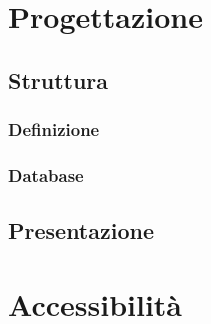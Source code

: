 \newpage
\section{Progettazione}
	\subsection{Struttura}
		\subsubsection{Definizione}
		\subsubsection{Database}
	\subsection{Presentazione}

\newpage
\section{Accessibilit\`a}
	
	
